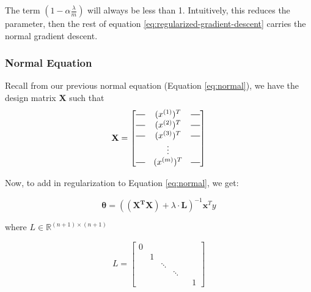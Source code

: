         The term $(1-\alpha \frac{\lambda}{m})$ will always be less than 1. Intuitively, this reduces the parameter, then the rest of equation \ref{eq:regularized-gradient-descent} carries the normal gradient descent.
        
        \subsubsection{Normal Equation}

        Recall from our previous normal equation (Equation \ref{eq:normal}), we have the design matrix \textbf{X} such that
            \[
            \mathbf{X} = \begin{bmatrix}
                \horzbar & (x^{(1)})^T & \horzbar \\
                \horzbar & (x^{(2)})^T & \horzbar \\
                \horzbar & (x^{(3)})^T & \horzbar \\
                         & \vdots      &          \\
                \horzbar & (x^{(m)})^T  & \horzbar \\
             \end{bmatrix}
            \]

            Now, to add in regularization to Equation \ref{eq:normal}, we get:

                 \begin{equation}
                     \boxed{
                     \mathbf{\theta} = (\mathbf{(X^TX)}+ \lambda\cdot\mathbf{L})^{-1} \mathbf{x}^Ty
                    }
                     \label{eq:regularized-normal}
                 \end{equation}

                 where $ L \in \mathbb{R}^{(n+1) \times (n+1)}$ 

                \begin{equation}
                    L = \begin{bmatrix}
                            0 & & & \\
                            & 1 & & \\
                            & &  \ddots & & \\
                            & &  & \ddots & \\
                            & & & & & 1 
                        \end{bmatrix}
                    \label{eq:regularized-L}
                \end{equation}
                
